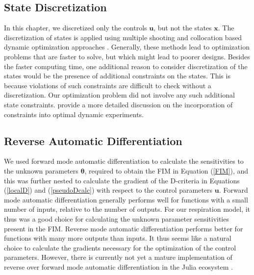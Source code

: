 \subsection{State Discretization}
In this chapter, we discretized only the controls $\bm u$, but not the states $\bm x$. The discretization of states is applied using multiple shooting and collocation based dynamic optimization approaches \parencite{biegler}. Generally, these methods lead to optimization problems that are faster to solve, but which might lead to poorer designs. Besides the faster computing time, one additional reason to consider discretization of the states would be the presence of additional constraints on the states. This is because violations of such constraints are difficult to check without a discretization. Our optimization problem did not involve any such additional state constraints. \textcite{nimmegeers} provide a more detailed discussion on the incorporation of constraints into optimal dynamic experiments.
\subsection{Reverse Automatic Differentiation}
We used forward mode automatic differentiation to calculate the sensitivities to the unknown parameters $\bm \theta$, required to obtain the FIM in Equation (\ref{FIM}), and this was further nested to calculate the gradient of the D-criteria in Equations (\ref{localD}) and (\ref{pseudoDcalc}) with respect to the control parameters $\bm u$. Forward mode automatic differentiation generally performs well for functions with a small number of inputs, relative to the number of outputs. For our respiration model, it thus was a good choice for calculating the unknown parameter sensitivities present in the FIM. Reverse mode automatic differentiation performs better for functions with many more outputs than inputs. It thus seems like a natural choice to calculate the gradients necessary for the optimization of the control parameters. However, there is currently not yet a mature implementation of reverse over forward mode automatic differentiation in the Julia ecosystem \parencite{rackauckas2}.
